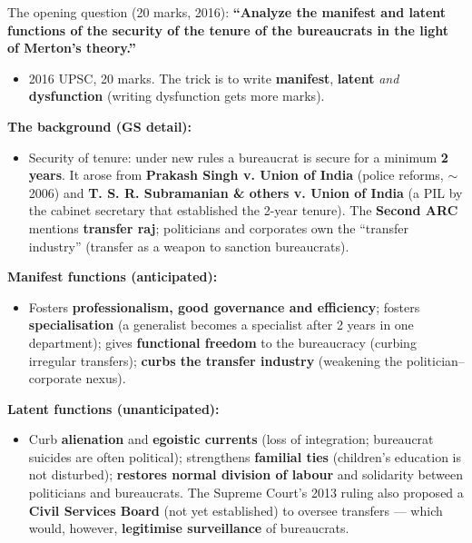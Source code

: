 The opening question (20 marks, 2016): \textbf{``Analyze the manifest and latent functions of the security of the tenure of the bureaucrats in the light of Merton's theory.''}

\begin{PYQLink}
\begin{itemize}
\item 2016 UPSC, 20 marks. The trick is to write \textbf{manifest}, \textbf{latent} \textit{and} \textbf{dysfunction} (writing dysfunction gets more marks).
\end{itemize}
\end{PYQLink}

\begin{DataFact}
\textbf{The background (GS detail):}
\begin{itemize}
\item Security of tenure: under new rules a bureaucrat is secure for a minimum \textbf{2 years}. It arose from \textbf{Prakash Singh v. Union of India} (police reforms, $\sim$2006) and \textbf{T. S. R. Subramanian \& others v. Union of India} (a PIL by the cabinet secretary that established the 2-year tenure). The \textbf{Second ARC} mentions \textbf{transfer raj}; politicians and corporates own the ``transfer industry'' (transfer as a weapon to sanction bureaucrats).
\end{itemize}
\end{DataFact}

\begin{ExampleBox}
\textbf{Manifest functions (anticipated):}
\begin{itemize}
\item Fosters \textbf{professionalism, good governance and efficiency}; fosters \textbf{specialisation} (a generalist becomes a specialist after 2 years in one department); gives \textbf{functional freedom} to the bureaucracy (curbing irregular transfers); \textbf{curbs the transfer industry} (weakening the politician--corporate nexus).
\end{itemize}
\end{ExampleBox}

\begin{ExampleBox}
\textbf{Latent functions (unanticipated):}
\begin{itemize}
\item Curb \textbf{alienation} and \textbf{egoistic currents} (loss of integration; bureaucrat suicides are often political); strengthens \textbf{familial ties} (children's education is not disturbed); \textbf{restores normal division of labour} and solidarity between politicians and bureaucrats. The Supreme Court's 2013 ruling also proposed a \textbf{Civil Services Board} (not yet established) to oversee transfers --- which would, however, \textbf{legitimise surveillance} of bureaucrats.
\end{itemize}
\end{ExampleBox}

